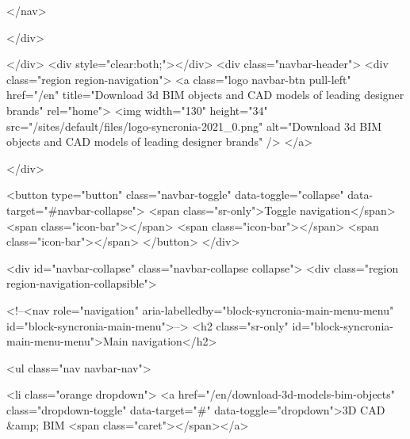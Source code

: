   </nav>

  </div>

            </div>
                    <div style="clear:both;"></div>
                    <div class="navbar-header">
              <div class="region region-navigation">
          <a class="logo navbar-btn pull-left" href="/en" title="Download 3d BIM objects and CAD models of leading designer brands" rel="home">
      <img width="130" height="34" src="/sites/default/files/logo-syncronia-2021_0.png" alt="Download 3d BIM objects and CAD models of leading designer brands" />
    </a>
      
  </div>

                                      <button type="button" class="navbar-toggle" data-toggle="collapse" data-target="#navbar-collapse">
                <span class="sr-only">Toggle navigation</span>
                <span class="icon-bar"></span>
                <span class="icon-bar"></span>
                <span class="icon-bar"></span>
              </button>
                      </div>

                                <div id="navbar-collapse" class="navbar-collapse collapse">
                <div class="region region-navigation-collapsible">
    
  
    <!--<nav role="navigation" aria-labelledby="block-syncronia-main-menu-menu" id="block-syncronia-main-menu">-->
                                <h2 class="sr-only" id="block-syncronia-main-menu-menu">Main navigation</h2>

              
              <ul class="nav navbar-nav">
            
                   
            
      
                            
    

                   
        <li class="orange dropdown">
        <a href="/en/download-3d-models-bim-objects" class="dropdown-toggle" data-target="#" data-toggle="dropdown">3D CAD &amp; BIM <span class="caret"></span></a>
            
